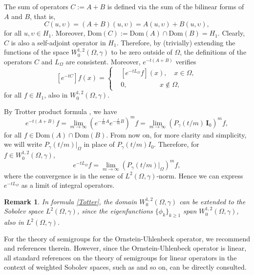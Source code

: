\documentclass[12pt]{amsart}
\newtheorem{remark}[theorem]{Remark}
\newcommand{\1}{\mathbf 1}
\begin{document}
The sum of operators $C:=A+B$ is defined via the sum of the bilinear forms of $A$ and $B$, that is,
\[
C(u,\upsilon)=(A+B)(u,\upsilon)=A(u,\upsilon)+B(u,\upsilon),
\]
for all $u,\upsilon\in H_1$. Moreover, $\text{Dom}(C):=\text{Dom}(A)\cap \text{Dom}(B)=H_1$. Clearly, $C$ is also a self-adjoint operator in $H_1$. Therefore, by (trivially) extending the functions of the space $W^{1,2}_0(\Omega,\gamma)$ to be zero outside of $\Omega$, the definitions of the operators $C$ and $L_\Omega$ are consistent. Moreover, $e^{-t(A+B)}$ verifies
\begin{equation}\label{Markov-kernel}
[e^{-tC}]f(x)=\left\{
\begin{aligned}
& [e^{-tL_\Omega}f](x),\quad x\in \Omega, \\
&  0,\quad \ \ \ \ \ \ \ \ \ \ \ \ \ \ \ \ \ x\notin \Omega,
\end{aligned}
\right.
\end{equation}
for all $f\in H_1$, also in $ W^{1,2}_0(\Omega,\gamma)$.

By Trotter product formula \cite[formula (3), page vii]{Book-Totter-product-formula}, we have
\begin{equation}
e^{-t(A+B)}f =\mathop{\lim}_{m\rightarrow \infty} (e^{-\frac{t}{m}A}e^{-\frac{t}{m}B})^m f=\mathop{\lim}_{m\rightarrow \infty} (P_\gamma (t/m)\,\mathbf{I}_0)^m f,
\end{equation}
for all $f\in \text{Dom}(A)\cap \text{Dom}(B)$. From now on, for more clarity and simplicity, we will write $P_\gamma (t/m)|_\Omega$ in place of $P_\gamma (t/m)I_0$. Therefore, for $f\in W^{1,2}_0(\Omega,\gamma)$,
\begin{equation}\label{Totter}
e^{-tL_\Omega}f=\mathop{\lim}_{m\rightarrow \infty} (P_\gamma (t/m)|_\Omega)^m f,
\end{equation}
where the convergence is in the sense of $L^2(\Omega,\gamma)$-norm. Hence we can express $e^{-tL_\Omega}$ as a limit of integral operators.


\begin{remark}\label{remark}
In formula \eqref{Totter}, the domain $W_0^{1,2}(\Omega,\gamma)$ can be extended to the Sobolev space $L^2(\Omega,\gamma)$, since the eigenfunctions $\{ \phi_k\}_{k\geq 1}$ span $W^{1,2}_0(\Omega,\gamma)$, also in $L^2(\Omega,\gamma)$.
\end{remark}

For the theory of semigroups for the Ornstein-Uhlenbeck operator, we recommend \cite{Book-Markov-Diffu,Cappa2019} and references therein. However, since the Ornstein-Uhlenbeck operator is linear, all standard references on the theory of semigroups for linear operators in the context of weighted Sobolev spaces, such as \cite{DaviesBook,Book-Engel2000,Pazy1983} and so on, can be directly consulted.
\end{document}
